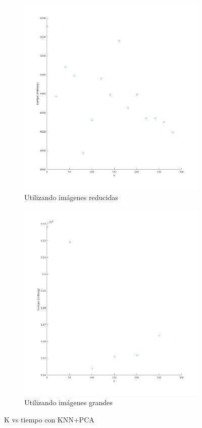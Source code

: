 \begin{figure}[H]
\begin{subfigure}[h]{0.62\linewidth}
\includegraphics[width=\linewidth]{img/k_pca_tiempo.png}
\caption{Utilizando imágenes reducidas}
\end{subfigure}
\hfill
\begin{subfigure}[h]{0.62\linewidth}
\includegraphics[width=\linewidth]{img/big_k_pca_tiempo.png}
\caption{Utilizando imágenes grandes}
\end{subfigure}%
\caption{K vs tiempo con KNN+PCA}
\end{figure}



